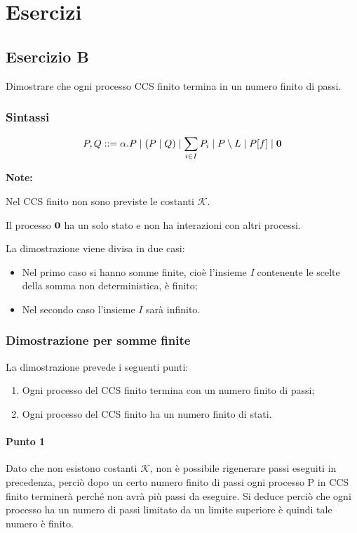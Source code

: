 \section{Esercizi}
\subsection{Esercizio B} 
Dimostrare che ogni processo CCS finito termina in un numero finito di passi.

\subsubsection{Sintassi}

\[
	P, Q ::=
	\alpha.P\mid
	(P\mid Q)\mid
	\sum_{i\in I} P_i\mid
	P\setminus L\mid
	P[f]\mid
	\mathbf{0}
\] 

\textbf{Note:}

Nel CCS finito non sono previste le costanti $\mathcal{K}$.
 
Il processo \(\mathbf{0}\) ha un solo stato e non ha interazioni con altri processi.

La dimostrazione viene divisa in due casi: 
\begin{itemize}
	\item Nel primo caso si hanno somme finite, cioè l'insieme \textit{I} contenente le scelte della somma non deterministica, è finito;
	\item Nel secondo caso l'insieme \(I\) sarà infinito.
\end{itemize} 
\subsubsection{Dimostrazione per somme finite}

La dimostrazione prevede i seguenti punti:
\begin{enumerate}
	\item Ogni processo del CCS finito termina con un numero finito di passi;
	\item Ogni processo del CCS finito ha un numero finito di stati.
\end{enumerate}

\paragraph{Punto 1} \mbox{}

Dato che non esistono costanti $\mathcal{K}$, non è possibile rigenerare passi eseguiti in precedenza, perciò dopo un certo numero finito di passi ogni processo P in CCS finito terminerà perché non avrà più passi da eseguire. Si deduce perciò che ogni processo ha un numero di passi limitato da un limite superiore è quindi tale numero è finito.

